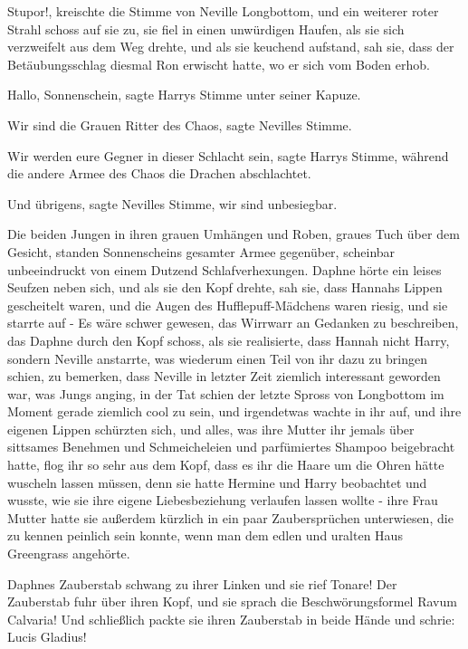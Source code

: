 \glqq{}Stupor!\grqq{}, kreischte die Stimme von Neville Longbottom, und ein
weiterer roter Strahl schoss auf sie zu, sie fiel in einen unwürdigen Haufen,
als sie sich verzweifelt aus dem Weg drehte, und als sie keuchend aufstand, sah
sie, dass der Betäubungsschlag diesmal Ron erwischt hatte, wo er sich vom Boden
erhob.

\glqq{}Hallo, Sonnenschein\grqq{}, sagte Harrys Stimme unter seiner Kapuze.

\glqq{}Wir sind die Grauen Ritter des Chaos\grqq{}, sagte Nevilles Stimme.

\glqq{}Wir werden eure Gegner in dieser Schlacht sein\grqq{}, sagte Harrys
Stimme, \glqq{}während die andere Armee des Chaos die Drachen
abschlachtet.\grqq{}

\glqq{}Und übrigens\grqq{}, sagte Nevilles Stimme, \glqq{}wir sind
unbesiegbar.\grqq{}

Die beiden Jungen in ihren grauen Umhängen und Roben, graues Tuch über dem
Gesicht, standen Sonnenscheins gesamter Armee gegenüber, scheinbar unbeeindruckt
von einem Dutzend Schlafverhexungen. Daphne hörte ein leises Seufzen neben sich,
und als sie den Kopf drehte, sah sie, dass Hannahs Lippen gescheitelt waren, und
die Augen des Hufflepuff-Mädchens waren riesig, und sie starrte auf - Es wäre
schwer gewesen, das Wirrwarr an Gedanken zu beschreiben, das Daphne durch den
Kopf schoss, als sie realisierte, dass Hannah nicht Harry, sondern Neville
anstarrte, was wiederum einen Teil von ihr dazu zu bringen schien, zu bemerken,
dass Neville in letzter Zeit ziemlich interessant geworden war, was Jungs
anging, in der Tat schien der letzte Spross von Longbottom im Moment gerade
ziemlich cool zu sein, und irgendetwas wachte in ihr auf, und ihre eigenen
Lippen schürzten sich, und alles, was ihre Mutter ihr jemals über sittsames
Benehmen und Schmeicheleien und parfümiertes Shampoo beigebracht hatte, flog ihr
so sehr aus dem Kopf, dass es ihr die Haare um die Ohren hätte wuscheln lassen
müssen, denn sie hatte Hermine und Harry beobachtet und wusste, wie sie ihre
eigene Liebesbeziehung verlaufen lassen wollte - ihre Frau Mutter hatte sie
außerdem kürzlich in ein paar Zaubersprüchen unterwiesen, die zu kennen peinlich
sein konnte, wenn man dem edlen und uralten Haus Greengrass angehörte.

Daphnes Zauberstab schwang zu ihrer Linken und sie rief \glqq{}Tonare!\grqq{} Der
Zauberstab fuhr über ihren Kopf, und sie sprach die Beschwörungsformel \glqq{}
Ravum Calvaria!\grqq{} Und schließlich packte sie ihren Zauberstab in beide
Hände und schrie: \glqq{}Lucis Gladius!\grqq{}

